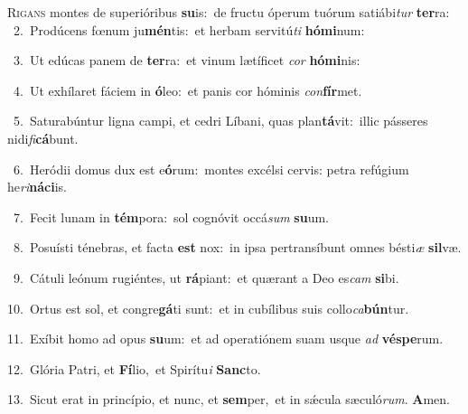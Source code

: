 \lettrine{\initial\textcolor{\initialcolor}{R}}{igans} montes de superióribus \textbf{su}\-is:~\star de fructu óperum tuórum satiábi\textit{tur} \textbf{ter}\-ra:\\
{\numbfont\textcolor{\numbcolor}{~2.}}~Prodúcens fœnum ju\-\textbf{mén}\-tis:~\star et herbam servitú\textit{ti} \textbf{hó}\-\textbf{mi}num:\par
{\numbfont\textcolor{\numbcolor}{~3.}}~Ut edúcas panem de \textbf{ter}\-ra:~\star et vinum lætíficet \textit{cor} \textbf{hó}\-\textbf{mi}nis:\par
{\numbfont\textcolor{\numbcolor}{~4.}}~Ut exhílaret fáciem in \textbf{ó}\-leo:~\star et panis cor hóminis \textit{con}\-\textbf{fír}met.\par
{\numbfont\textcolor{\numbcolor}{~5.}}~Saturabúntur ligna campi, et cedri Líbani, quas plan\-\textbf{tá}\-vit:~\star illic pásseres nidi\-\textit{fi}\-\textbf{cá}bunt.\par
{\numbfont\textcolor{\numbcolor}{~6.}}~Heródii domus dux est e\-\textbf{ó}\-rum:~\star montes excélsi cervis: petra refúgium he\-\textit{ri}\-\textbf{ná}\textbf{ci}is.\par
{\numbfont\textcolor{\numbcolor}{~7.}}~Fecit lunam in \textbf{tém}\-pora:~\star sol cognóvit occá\textit{sum} \textbf{su}\-um.\par
{\numbfont\textcolor{\numbcolor}{~8.}}~Posuísti ténebras, et facta \textbf{est} nox:~\star in ipsa pertransíbunt omnes bésti\textit{æ} \textbf{sil}\-væ.\par
{\numbfont\textcolor{\numbcolor}{~9.}}~Cátuli leónum rugiéntes, ut \textbf{rá}\-piant:~\star et quærant a Deo es\textit{cam} \textbf{si}\-bi.\par
{\numbfont\textcolor{\numbcolor}{10.}}~Ortus est sol, et congre\-\textbf{gá}\-ti sunt:~\star et in cubílibus suis collo\-\textit{ca}\-\textbf{bún}tur.\par
{\numbfont\textcolor{\numbcolor}{11.}}~Exíbit homo ad opus \textbf{su}\-um:~\star et ad operatiónem suam usque \textit{ad} \textbf{vés}\-\textbf{pe}rum.\par
{\numbfont\textcolor{\numbcolor}{12.}}~Glória Patri, et \textbf{Fí}\-lio,~\star et Spirítu\textit{i} \textbf{Sanc}\-to.\par
{\numbfont\textcolor{\numbcolor}{13.}}~Sicut erat in princípio, et nunc, et \textbf{sem}\-per,~\star et in sǽcula sæculó\-\textit{rum}\-. \textbf{A}\-men.\par
